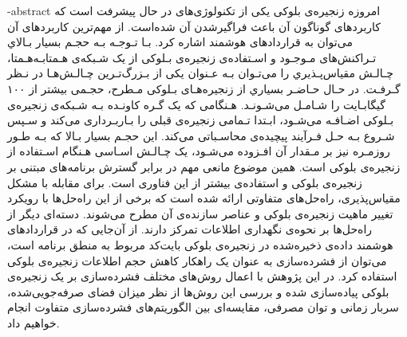 \fa-abstract{
امروزه زنجیره‌ی بلوکی یکی از تکنولوژی‌های در حال پیشرفت است که کاربردهای گوناگون آن باعث فراگیرشدن آن شده‌است. از مهم‌ترین کاربردهای آن می‌توان به قراردادهای هوشمند اشاره کرد. بـا تـوجـه بـه حجـم بسیار بـالاي تـراکنش‌های مـوجـود و اسـتفاده‌ی زنجیره‌‌ی بـلوکی از یک شـبکه‌ی هـمتابـه‌هـمتا، چـالـش مقیاس‌پـذیري را می‌تـوان بـه عـنوان یکی از بـزرگ‌تـرین چـالـش‌هـا در نـظر گـرفـت. در حـال حـاضـر بسیاري از زنجیره‌هـای بـلوکی مـطرح، حجـمی بیشتر از ۱۰۰ گیگابـایت را شـامـل می‌شـونـد. هـنگامی که یک گـره کاونـده بـه شـبکه‌ی زنجیره‌ی بـلوکی اضـافـه می‌شـود، ابـتدا تـمامی زنجیره‌ی قبلی را بـاربـرداری می‌کند و سـپس شـروع بـه حـل فـرآیند پیچیده‌ی محاسـباتی می‌کند. این حجـم بسیار بـالا که بـه طـور روزمـره نیز بر مـقدار آن افـزوده می‌شـود، یک چـالـش اسـاسی هـنگام اسـتفاده از زنجیره‌ی بلوکی است. همین موضوع مانعی مهم در برابر گسترش برنامه‌های مبتنی بر زنجیره‌ی بلوکی و استفاده‌ی بیشتر از این فناوری است. برای مقابله با مشکل مقیاس‌پذیری، راه‌حل‌های متفاوتی ارائه شده است که برخی از این راه‌حل‌ها با رویکرد تغییر ماهیت زنجیره‌ی بلوکی و عناصر سازنده‌ی آن مطرح می‌شوند. دسته‌ای دیگر از راه‌حل‌ها بر نحوه‌ی نگهداری اطلاعات تمرکز دارند. از آن‌جایی که در قراردادهای هوشمند داده‌ی ذخیره‌شده در زنجیره‌ی بلوکی بایت‌کد مربوط به منطق برنامه است، می‌توان از فشرده‌سازی به عنوان یک راهکار کاهش حجم اطلاعات زنجیره‌ی بلوکی استفاده کرد. در این پژوهش با اعمال روش‌های مختلف فشرده‌سازی بر یک زنجیره‌ی بلوکی پیاده‌سازی شده و بررسی این روش‌ها از نظر میزان فضای صرفه‌جویی‌شده، سربار زمانی و توان مصرفی، مقایسه‌ای بین الگوریتم‌های فشرده‌سازی متفاوت انجام خواهیم داد. 
}
